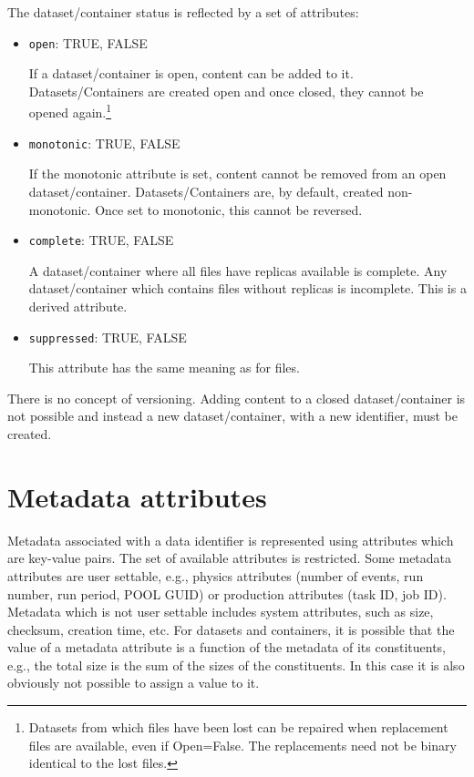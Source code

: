 \documentclass{atlasnote}
\begin{document}
\label{sec:status}
The dataset/container status is reflected by a set of attributes:

\begin{itemize}
\item{} \texttt{open}: TRUE, FALSE

If a dataset/container is open, content can be added to it. Datasets/Containers are created open and once closed, they cannot be opened again.\footnote{Datasets from which files have been lost can be repaired when replacement files are available, even if Open=False. The replacements need not be binary identical to the lost files.}

\item{} \texttt{monotonic}: TRUE, FALSE

If the monotonic attribute is set, content cannot be removed from an open dataset/container. Datasets/Containers are, by default, created non-monotonic. Once set to monotonic, this cannot be reversed.

\item{} \texttt{complete}: TRUE, FALSE

A dataset/container where all files have replicas available is complete. Any dataset/container which contains files without replicas is incomplete. This is a derived attribute.

\item{} \texttt{suppressed}: TRUE, FALSE

This attribute has the same meaning as for files.
\end{itemize}

\noindent There is no concept of versioning. Adding content to a closed dataset/container is not possible and instead a new dataset/container, with a new identifier, must be created.

\section{Metadata attributes}

Metadata associated with a data identifier is represented using attributes which are key-value pairs. The set of available attributes is restricted. Some metadata attributes are user settable, e.g., physics attributes (number of events, run number, run period, POOL GUID) or production attributes (task ID, job ID). Metadata which is not user settable includes system attributes, such as size, checksum, creation time, etc. For datasets and containers, it is possible that the value of a metadata attribute is a function of the metadata of its constituents, e.g., the total size is the sum of the sizes of the constituents. In this case it is also obviously not possible to assign a value to it.
\end{document}

